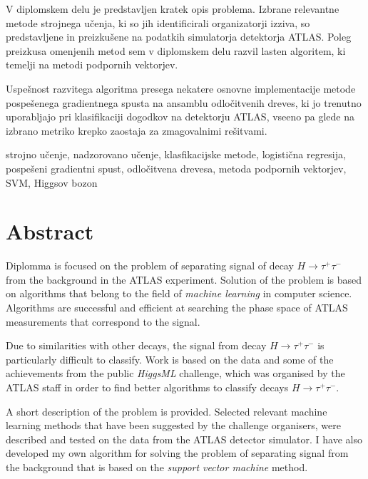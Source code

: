 V diplomskem delu je predstavljen kratek opis problema. Izbrane relevantne metode strojnega učenja, ki so jih identificirali organizatorji izziva, so predstavljene in preizkušene na podatkih simulatorja detektorja ATLAS. Poleg preizkusa omenjenih metod sem v diplomskem delu razvil lasten algoritem, ki temelji na metodi podpornih vektorjev.

Uspešnost razvitega algoritma presega nekatere osnovne implementacije metode pospešenega gradientnega spusta na ansamblu odločitvenih dreves, ki jo trenutno uporabljajo pri klasifikaciji dogodkov na detektorju ATLAS, vseeno pa glede na izbrano metriko krepko zaostaja za zmagovalnimi rešitvami.


\vspace{1.3cm}


\vspace{0.1cm}
\noindent strojno učenje, nadzorovano učenje, klasfikacijske metode, logistična regresija, pospešeni gradientni spust, odločitvena drevesa, metoda podpornih vektorjev, SVM, Higgsov bozon

\chapter*{Abstract}
\vspace{1.3cm}
\noindent Diplomma is focused on the problem of separating signal of decay $H \rightarrow \tau^+\tau^-$  from the background in the ATLAS experiment. Solution of the problem is based on algorithms that belong to the field of \textit{machine learning} in  computer science. Algorithms are successful and efficient at searching the phase space of ATLAS measurements that correspond to the signal.

Due to similarities with other decays, the signal from decay $H \rightarrow \tau^+\tau^-$ is particularly difficult to classify. Work is based on the data and some of the achievements from the public \textit{HiggsML} challenge, which was organised by the ATLAS staff in order to find better algorithms to classify decays $H \rightarrow \tau^+\tau^-$.

A short description of the problem is provided. Selected relevant machine learning methods that have been suggested by the challenge organisers, were described and tested on the data from the ATLAS detector simulator. I have also developed my own algorithm for solving the problem of separating signal from the background that is based on the \textit{support vector machine} method.

